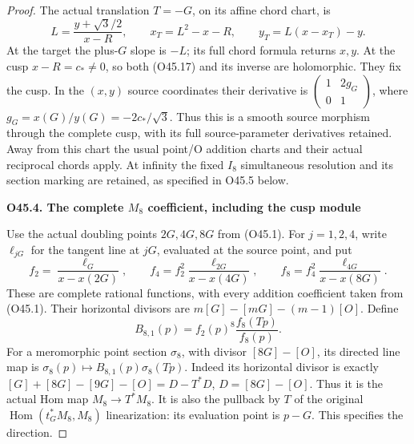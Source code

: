 \begin{proof}
The actual translation \(T=-G\), on its affine chord chart,
is
\[
 L=\frac{y+\sqrt3/2}{x-R},\qquad
 x_T=L^2-x-R,\qquad
 y_T=L(x-x_T)-y.
 \tag{O45.17}
\]
At the target the plus-\(G\) slope is \(-L\); its full chord
formula returns \(x,y\). At the cusp \(x-R=c_*\ne0\), so
both (O45.17) and its inverse are holomorphic. They fix the
cusp. In the \((x,y)\) source coordinates their derivative is
\(\left(\begin{smallmatrix}1&2g_G\\0&1\end{smallmatrix}\right)\),
where \(g_G=x(G)/y(G)=-2c_*/\sqrt3\). Thus this is a smooth
source morphism through the complete cusp, with its full
source-parameter derivatives retained. Away from this chart
the usual point/O addition charts and their actual reciprocal
chords apply. At infinity the fixed \(I_8\) simultaneous
resolution and its section marking are retained, as specified
in O45.5 below.

\par

\medskip\noindent\textbf{O45.4. The complete \(M_8\) coefficient, including the cusp module}

\par\nobreak

Use the actual doubling points \(2G,4G,8G\) from (O45.1).
For \(j=1,2,4\), write \(\ell_{jG}\) for the tangent line
at \(jG\), evaluated at the source point, and put
\[
 f_2=\frac{\ell_G}{x-x(2G)},\qquad
 f_4=f_2^2\frac{\ell_{2G}}{x-x(4G)},\qquad
 f_8=f_4^2\frac{\ell_{4G}}{x-x(8G)}.
 \tag{O45.18}
\]
These are complete rational functions, with every addition
coefficient taken from (O45.1). Their horizontal divisors
are \(m[G]-[mG]-(m-1)[O]\). Define
\[
 B_{8,1}(p)=f_2(p)^8\frac{f_8(Tp)}{f_8(p)}.
 \tag{O45.19}
\]
For a meromorphic point section \(\sigma_8\), with divisor
\([8G]-[O]\), its directed line map is
\(\sigma_8(p)\mapsto B_{8,1}(p)\sigma_8(Tp)\).
Indeed its horizontal divisor is exactly
\([G]+[8G]-[9G]-[O]=D-T^*D\), \(D=[8G]-[O]\).
Thus it is the actual Hom map \(M_8\to T^*M_8\).
It is also the pullback by \(T\) of the original
\(\operatorname{Hom}(t_G^*M_8,M_8)\) linearization: its
evaluation point is \(p-G\). This specifies the direction.


\end{proof}
